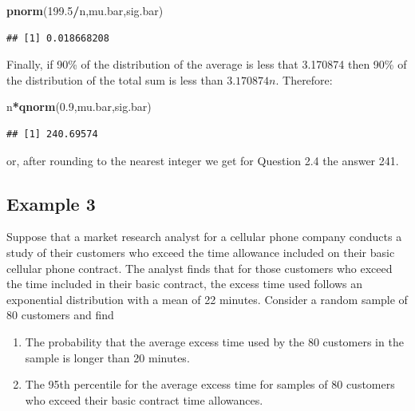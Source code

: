 \documentclass[]{krantz}
\makeatletter
\newenvironment{Shaded}{\begin{snugshade}}{\end{snugshade}}
\newcommand{\FloatTok}[1]{\textcolor[rgb]{0.00,0.00,0.81}{#1}}
\newcommand{\KeywordTok}[1]{\textcolor[rgb]{0.13,0.29,0.53}{\textbf{#1}}}
\newcommand{\NormalTok}[1]{#1}
\newcommand{\OperatorTok}[1]{\textcolor[rgb]{0.81,0.36,0.00}{\textbf{#1}}}
\newenvironment{kframe}{%
\medskip{}
\setlength{\fboxsep}{.8em}
 \def\at@end@of@kframe{}%
 \ifinner\ifhmode%
  \def\at@end@of@kframe{\end{minipage}}%
  \begin{minipage}{\columnwidth}%
 \fi\fi%
 \def\FrameCommand##1{\hskip\@totalleftmargin \hskip-\fboxsep
 \colorbox{shadecolor}{##1}\hskip-\fboxsep
     \hskip-\linewidth \hskip-\@totalleftmargin \hskip\columnwidth}%
 \MakeFramed {\advance\hsize-\width
   \@totalleftmargin\z@ \linewidth\hsize
   \@setminipage}}%
 {\par\unskip\endMakeFramed%
 \at@end@of@kframe}
\renewenvironment{Shaded}{\begin{kframe}}{\end{kframe}}
\theoremstyle{definition}
\theoremstyle{definition}
\theoremstyle{definition}
\theoremstyle{remark}
\makeatother
\begin{document}
\begin{Shaded}
\begin{Highlighting}[]
\KeywordTok{pnorm}\NormalTok{(}\FloatTok{199.5}\OperatorTok{/}\NormalTok{n,mu.bar,sig.bar)}
\end{Highlighting}
\end{Shaded}

\begin{verbatim}
## [1] 0.018668208
\end{verbatim}

Finally, if 90\% of the distribution of the average is less that 3.170874
then 90\% of the distribution of the total sum is less than \(3.170874 n\).
Therefore:

\begin{Shaded}
\begin{Highlighting}[]
\NormalTok{n}\OperatorTok{*}\KeywordTok{qnorm}\NormalTok{(}\FloatTok{0.9}\NormalTok{,mu.bar,sig.bar)}
\end{Highlighting}
\end{Shaded}

\begin{verbatim}
## [1] 240.69574
\end{verbatim}

or, after rounding to the nearest integer we get for Question 2.4 the
answer 241.

\hypertarget{example-3}{%
\subsection{Example 3}\label{example-3}}

Suppose that a market research analyst for a cellular phone company
conducts a study of their customers who exceed the time allowance
included on their basic cellular phone contract. The analyst finds that
for those customers who exceed the time included in their basic
contract, the excess time used follows an exponential distribution with
a mean of 22 minutes. Consider a random sample of 80 customers and find

\begin{enumerate}
\def\labelenumi{\arabic{enumi}.}
\item
  The probability that the average excess time used by the 80
  customers in the sample is longer than 20 minutes.
\item
  The 95th percentile for the average excess time for samples of 80
  customers who exceed their basic contract time allowances.
\end{enumerate}
\end{document}
